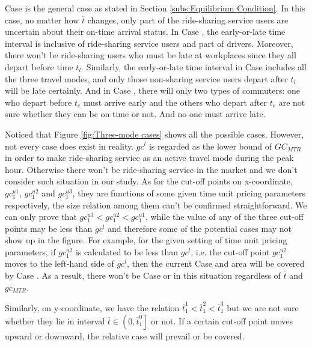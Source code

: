 \documentclass[a4paper,11pt]{article}
\begin{document}
Case \uppercase\expandafter{} is the general case as stated in Section \ref{subs:Equilibrium Condition}. In this case, no matter how $\overline{t}$ changes, only part of the ride-sharing service users are uncertain about their on-time arrival status. 
In Case \uppercase\expandafter{}, the early-or-late time interval is inclusive of ride-sharing service users and part of drivers. Moreover, there won't be ride-sharing users who must be late at workplaces since they all depart before time $t_l$. 
Similarly, the early-or-late time interval in Case \uppercase\expandafter{} includes all the three travel modes, and only those non-sharing service users depart after $t_l$ will be late certainly.
And in Case \uppercase\expandafter{}, there will only two types of commuters: one who depart before $t_e$ must arrive early and the others who depart after $t_e$ are not sure whether they can be on time or not. And no one must arrive late.

Noticed that Figure \ref{fig:Three-mode cases} shows all the possible cases. However, not every case does exist in reality. $gc^{l}$ is regarded as the lower bound of $GC_{MTR}$ in order to make ride-sharing service as an active travel mode during the peak hour. Otherwise there won't be ride-sharing service in the market and we don't consider such situation in our study. As for the cut-off points on x-coordinate,  $gc_1^{u1}$, $gc_1^{u2}$ and $gc_1^{u3}$, they are functions of some given time unit pricing parameters respectively, the size relation among them can’t be confirmed straightforward. We can only prove that $ gc_1^{u3} < gc^{u2}_1 < gc_1^{u1}$, while the value of any of the three cut-off points may be less than $gc^{l}$ and therefore some of the potential cases may not show up in the figure. For example, for the given setting of time unit pricing parameters, if $gc_1^{u2}$ is calculated to be less than $gc^{l}$, i.e. the cut-off point $gc_1^{u2}$ moves to the left-hand side of $gc^{l}$, then the current Case  \uppercase\expandafter{} and  \uppercase\expandafter{} area will be covered by Case  \uppercase\expandafter{}. As a result, there won’t be Case  \uppercase\expandafter{} or  \uppercase\expandafter{} in this situation regardless of $\overline{t}$ and $gc_{MTR}$.

Similarly, on y-coordinate, we have the relation $\overline{t}^1_1 < \overline{t}^2_1 < \overline{t}^3_1$ but we are not sure whether they lie in interval $\overline{t} \in \left(0, \overline{t}^0_1 \right]$ or not. If a certain cut-off point moves upward or downward, the relative case will prevail or be covered.
\end{document}
